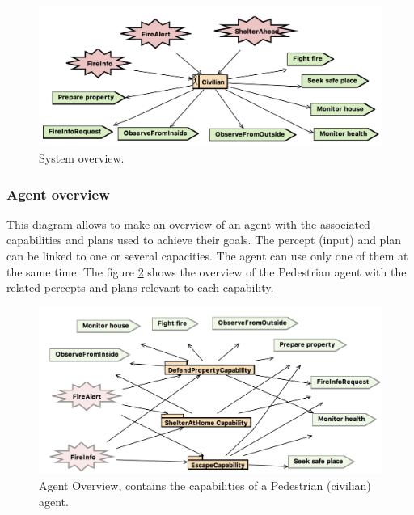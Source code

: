 \documentclass[12pt, a4paper]{memoir} %
\begin{document}
				\begin{figure}
					\begin{center}
						\includegraphics[scale=0.4]{SystemOverview.png}
						\caption{\label{fig:system-overview} System overview.}
					\end{center}
				\end{figure}

			\subsubsection{Agent overview}

				This diagram allows to make an overview of an agent with the associated capabilities and plans used to achieve
				their goals. The percept (input) and plan can be linked to one or several capacities. The agent can use only one of
				them at the same time. The figure \ref{fig:agent-overview} shows the overview of the Pedestrian agent with the
				related percepts and plans relevant to each capability.

				\begin{figure}
					\begin{center}
						\includegraphics[scale=0.4]{Civillian-AgentOverview.png}
						\caption{\label{fig:agent-overview} Agent Overview, contains the capabilities of a Pedestrian (civilian) agent.}
					\end{center}
				\end{figure}
\end{document}
